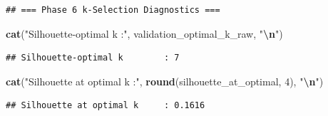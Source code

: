 \documentclass[
]{article}
\newenvironment{Shaded}{\begin{snugshade}}{\end{snugshade}}
\newcommand{\CommentTok}[1]{\textcolor[rgb]{0.56,0.35,0.01}{\textit{#1}}}
\newcommand{\DecValTok}[1]{\textcolor[rgb]{0.00,0.00,0.81}{#1}}
\newcommand{\FunctionTok}[1]{\textcolor[rgb]{0.13,0.29,0.53}{\textbf{#1}}}
\newcommand{\NormalTok}[1]{#1}
\newcommand{\OtherTok}[1]{\textcolor[rgb]{0.56,0.35,0.01}{#1}}
\newcommand{\SpecialCharTok}[1]{\textcolor[rgb]{0.81,0.36,0.00}{\textbf{#1}}}
\newcommand{\StringTok}[1]{\textcolor[rgb]{0.31,0.60,0.02}{#1}}
\begin{document}
\begin{Shaded}
\end{Shaded}

\begin{verbatim}
## === Phase 6 k-Selection Diagnostics ===
\end{verbatim}

\begin{Shaded}
\begin{Highlighting}[]
\FunctionTok{cat}\NormalTok{(}\StringTok{"Silhouette{-}optimal k        :"}\NormalTok{, validation\_optimal\_k\_raw, }\StringTok{"}\SpecialCharTok{\textbackslash{}n}\StringTok{"}\NormalTok{)}
\end{Highlighting}
\end{Shaded}

\begin{verbatim}
## Silhouette-optimal k        : 7
\end{verbatim}

\begin{Shaded}
\begin{Highlighting}[]
\FunctionTok{cat}\NormalTok{(}\StringTok{"Silhouette at optimal k     :"}\NormalTok{, }\FunctionTok{round}\NormalTok{(silhouette\_at\_optimal, }\DecValTok{4}\NormalTok{), }\StringTok{"}\SpecialCharTok{\textbackslash{}n}\StringTok{"}\NormalTok{)}
\end{Highlighting}
\end{Shaded}

\begin{verbatim}
## Silhouette at optimal k     : 0.1616
\end{verbatim}
\end{document}
